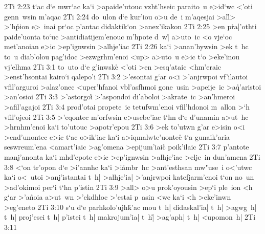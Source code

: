 \vs 2Ti 2:23
t`ac
d`e
mwr`ac
ka`i
>apaide'utouc
vzht'hseic
paraito~u
e>id`wc
<'oti
genn~wsin
m'aqac\bibvsend
\vs 2Ti 2:24
do~ulon
d`e
kur'iou
o>u
de~i
m'aqesjai
>al\r{l}>
>'h\r{p}ion
e>~inai
pr`oc
p'antac
didaktik`on
>anex'ikakon\bibvsend
\vs 2Ti 2:25
>en
p\r{r}a|'othti
paide'uonta
to`uc
>antidiatijem'enouc
m'hpote
d~w|\r{}
a>uto~ic
<o
vje`oc
met'anoian
e>ic
>ep'ignwsin
>alhje'iac\bibvsend
\vs 2Ti 2:26
ka`i
>anan'hywsin
>ek
t~hc
to~u
diab'olou
pag'idoc
>ezwgrhm'enoi
<up>
a>uto~u
e>ic
t`o
>eke'inou
vj'elhma\bibvsend
\vs 2Ti 3:1
to~uto
d`e
g'inwsk\r{e}
<'oti
>en
>esq'ataic
<hm'eraic
>enst'hsontai
kairo`i
qalepo'i\bibvsend
\vs 2Ti 3:2
>'esontai
g`ar
o<i
>'anjrwpoi
vf'ilautoi
vfil'arguroi
>alaz'onec
<uper'hfanoi
vbl'asfhmoi
gone~usin
>apeije~ic
>a\r{q}'aristoi
>an'osioi\bibvsend
\vs 2Ti 3:3
>'astorgoi\r{}
>'aspondoi
di'aboloi
>akrate~ic
>an'hmeroi
>afil'agajoi\bibvsend
\vs 2Ti 3:4
prod'otai
propete~ic
tetufwm'enoi
vfil'hdonoi
m~allon
>`h
vfil'ojeoi\bibvsend
\vs 2Ti 3:5
>'eqontec
m'orfwsin
e>usebe'iac
t`hn
d`e
d'unamin
a>ut~hc
>hrnhm'enoi
ka`i
to'utouc
>apotr'epou\bibvsend
\vs 2Ti 3:6
>ek
to'utwn
g'ar
e>isin
o<i
>end'unontec
e>ic
t`ac
o>ik'iac
ka`i
a>iqmalwte'uontec\r{}
t`a
gunaik'aria
seswreum'ena
<amart'iaic
>ag'omena
>epijum'iai\r{c}
poik'ilaic\bibvsend
\vs 2Ti 3:7
p'antote
manj'anonta
ka`i
mhd'epote
e>ic
>ep'ignwsin
>alhje'iac
>elje~in
dun'amena\bibvsend
\vs 2Ti 3:8
<`on
tr'opon
d`e
>i'annhc
ka`i
>i\r{a}mbr~hc
>ant'esthsan
mw"use~i
o<'utwc
ka`i
o<~utoi
>anj'istantai
t~h|
>alhje'ia|
>'anjrwpoi
katefjarm'enoi
t`on
no~un
>ad'okimoi
per`i
t`hn
p'istin\bibvsend
\vs 2Ti 3:9
>all>
o>u
prok'oyousin
>ep`i
ple~ion
<h
g`ar
>'a\r{n}oia
a>ut~wn
>'ekdhloc
>'estai
p~asin
<wc
ka`i
<h
>eke'inwn
>eg'eneto\bibvsend
\vs 2Ti 3:10
s`u
d`e
parhkolo'ujh\r{k}'ac
mou
t~h|
didaskal'ia|
t~h|
>agwg~h|
t~h|
proj'esei
t~h|
p'istei
t~h|
makrojum'ia|
t~h|\r{}
>ag'aph|
t~h|
<upomon~h|\bibvsend
\vs 2Ti 3:11
